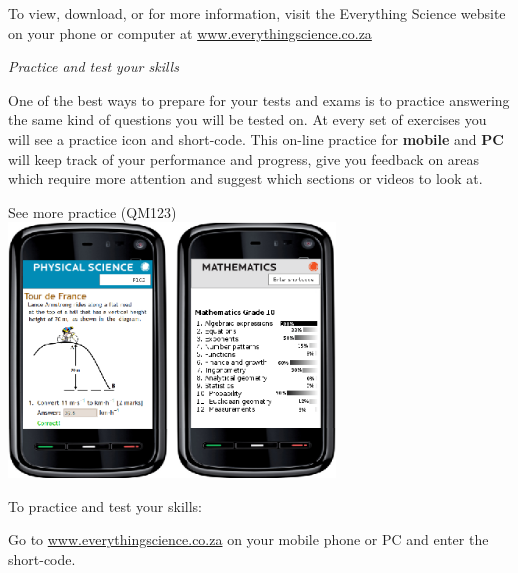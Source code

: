 \newpage
\thispagestyle{empty}
{\Large

To view, download, or for more information, visit the Everything Science website on your phone or
computer at \underline{www.everythingscience.co.za}  \par
\vspace*{1cm}
{\normalfont\sffamily\fontsize{22}\normalfont\itshape Practice and test your skills} \par


One of the best ways to prepare for your tests and exams is to practice answering the same kind of
questions you will be tested on. At every set of exercises you will see a practice icon and short-code.
This on-line practice for \textbf{mobile} and \textbf{PC} will keep track of your performance and progress, give you
feedback on areas which require more attention and suggest which sections or videos to look at.

\begin{center}
See more practice  (QM123) \\
\includegraphics[width=0.65\textwidth]{title_images/practicephones.eps}
\end{center}
\par



To practice and test your skills:\par

Go to \underline{www.everythingscience.co.za} on your mobile phone or PC and enter the short-code.\par

\vspace*{1cm}


}
